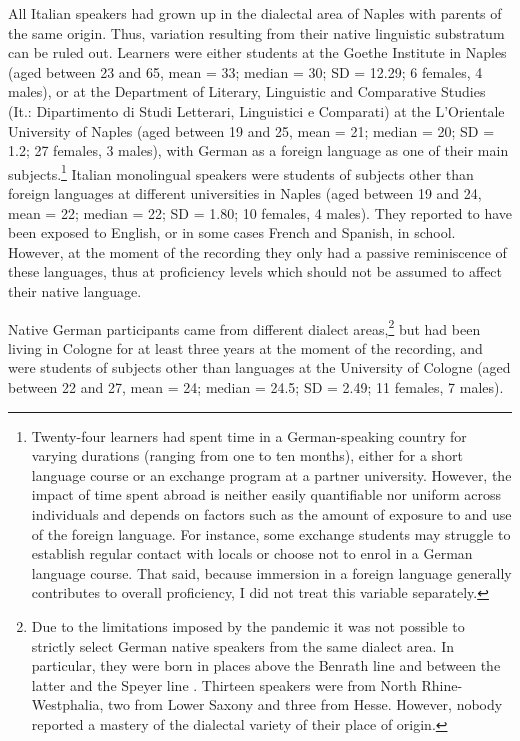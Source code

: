 All Italian speakers had grown up in the dialectal area of Naples with parents of the same origin. Thus, variation resulting from their native linguistic substratum can be ruled out. Learners were either students at the Goethe Institute in Naples (aged between 23 and 65, mean = 33; median = 30; SD = 12.29; 6 females, 4 males), or at the Department of Literary, Linguistic and Comparative Studies (It.: Dipartimento di Studi Letterari, Linguistici e Comparati) at the L’Orientale University of Naples (aged between 19 and 25, mean = 21; median = 20; SD = 1.2; 27 females, 3 males), with German as a foreign language as one of their main subjects.\footnote{Twenty-four learners had spent time in a German-speaking country for varying durations (ranging from one to ten months), either for a short language course or an exchange program at a partner university. However, the impact of time spent abroad is neither easily quantifiable nor uniform across individuals and depends on factors such as the amount of exposure to and use of the foreign language. For instance, some exchange students may struggle to establish regular contact with locals or choose not to enrol in a German language course. That said, because immersion in a foreign language generally contributes to overall proficiency, I did not treat this variable separately.} Italian monolingual speakers were students of subjects other than foreign languages at different universities in Naples (aged between 19 and 24, mean = 22; median = 22; SD = 1.80; 10 females, 4 males). They reported to have been exposed to English, or in some cases French and Spanish, in school. However, at the moment of the recording they only had a passive reminiscence of these languages, thus at proficiency levels which should not be assumed to affect their native language.

Native German participants came from different dialect areas,\footnote{Due to the limitations imposed by the pandemic it was not possible to strictly select German native speakers from the same dialect area. In particular, they were born in places above the Benrath line \citep{Wenker1877} and between the latter and the Speyer line \citep{Paul2013}. Thirteen speakers were from North Rhine-Westphalia, two from Lower Saxony and three from Hesse. However, nobody reported a mastery of the dialectal variety of their place of origin.} but had been living in Cologne for at least three years at the moment of the recording, and were students of subjects other than languages at the University of Cologne (aged between 22 and 27, mean = 24; median = 24.5; SD = 2.49; 11 females, 7 males).

